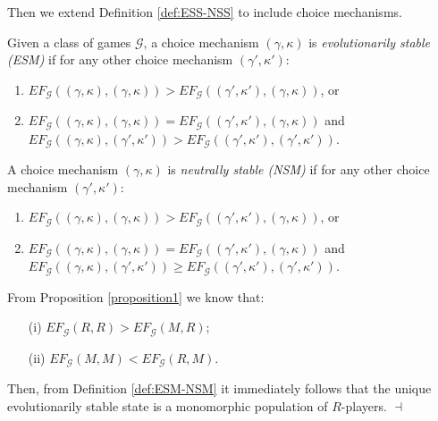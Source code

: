 \documentclass[fleqn,reqno,11pt]{article}
\begin{document}
\medskip{}

\noindent Then we extend Definition \ref{def:ESS-NSS} to include choice mechanisms. 

\begin{definition} \label{def:ESM-NSM}
Given a class of games $\mathcal{G}$, a choice mechanism $(\gamma, \kappa)$ is \emph{evolutionarily stable
(ESM)} if for any other choice mechanism $(\gamma', \kappa')$:
\begin{enumerate}
\item $EF_{\mathcal{G}}((\gamma, \kappa),(\gamma, \kappa))>EF_{\mathcal{G}}((\gamma', \kappa'),(\gamma, \kappa))$, or
\item $EF_{\mathcal{G}}((\gamma, \kappa),(\gamma, \kappa))=EF_{\mathcal{G}}((\gamma', \kappa'),(\gamma, \kappa))$ and $EF_{\mathcal{G}}((\gamma, \kappa),(\gamma', \kappa'))>EF_{\mathcal{G}}((\gamma', \kappa'),(\gamma', \kappa'))$.
\end{enumerate}
\noindent A choice mechanism $(\gamma, \kappa)$ is \emph{neutrally stable (NSM)} if
for any other choice mechanism $(\gamma', \kappa')$:
\begin{enumerate}
\item $EF_{\mathcal{G}}((\gamma, \kappa),(\gamma, \kappa))>EF_{\mathcal{G}}((\gamma', \kappa'),(\gamma, \kappa))$, or
\item $EF_{\mathcal{G}}((\gamma, \kappa),(\gamma, \kappa))= EF_{\mathcal{G}}((\gamma', \kappa'),(\gamma, \kappa))$ and $EF_{\mathcal{G}}((\gamma, \kappa),(\gamma', \kappa'))\geq EF_{\mathcal{G}}((\gamma', \kappa'),(\gamma', \kappa'))$.
\end{enumerate}
\end{definition}

\noindent From Proposition \ref{proposition1} we know that: 

\begin{itemize}
\item[(i)] $EF_{\mathcal{G}}(R,R)>EF_{\mathcal{G}}(M,R);$
\item[(ii)] $EF_{\mathcal{G}}(M,M)<EF_{\mathcal{G}}(R,M).$
\end{itemize}

\noindent Then, from Definition \ref{def:ESM-NSM} it immediately follows that the unique evolutionarily stable state is a monomorphic population of $R$-players. $\dashv$




\printbibliography[heading=bibintoc]
\end{document}
